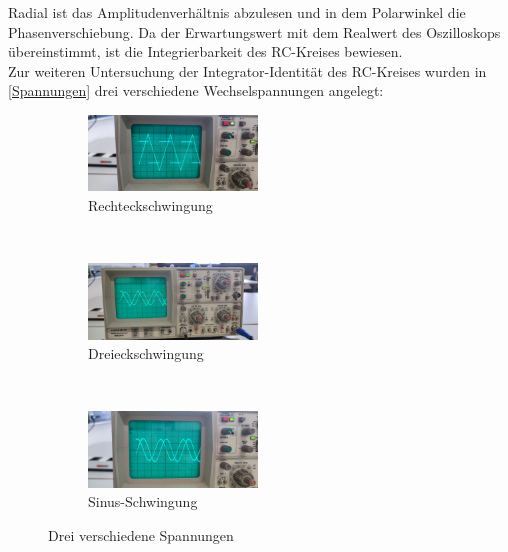 Radial ist das Amplitudenverhältnis abzulesen und in dem Polarwinkel die Phasenverschiebung. Da der Erwartungswert mit dem Realwert
des Oszilloskops übereinstimmt, ist die Integrierbarkeit des RC-Kreises bewiesen. \\
Zur weiteren Untersuchung der Integrator-Identität des RC-Kreises wurden in \autoref{Spannungen} drei verschiedene Wechselspannungen angelegt:
\begin{figure}
	\centering
	\begin{subfigure}[b]{0.3\textwidth}
		\centering
		\includegraphics[width=4.5cm]{build/integrator-rechteck.jpeg}
		\caption{Rechteckschwingung}
	\end{subfigure}
	~
	\begin{subfigure}[b]{0.3\textwidth}
		\centering
		\includegraphics[width=4.5cm]{build/integrator-saegezahn.jpeg}
		\caption{Dreieckschwingung}
	\end{subfigure}
	~
	\begin{subfigure}[b]{0.3\textwidth}
		\centering
		\includegraphics[width=4.5cm]{build/integrator-sinus.jpeg}
		\caption{Sinus-Schwingung}
	\end{subfigure}
  \caption{Drei verschiedene Spannungen}
  \label{Spannungen}
\end{figure}

